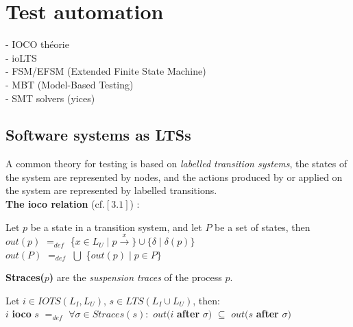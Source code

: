 \documentclass[a4paper]{report}
\begin{document}
\section*{Test automation}
- IOCO théorie\\
- ioLTS\\
- FSM/EFSM (Extended Finite State Machine)\\
- MBT (Model-Based Testing)\\
- SMT solvers (yices)\\

\subsection*{Software systems as LTSs}
A common theory for testing is based on \textit{labelled transition systems}, the states of the system are represented by nodes, and the actions produced by or applied on the system are represented by labelled transitions.\\
\newline
\textbf{The ioco relation} (cf.$[3.1]$) :\\
\newline

\begin{definition}
Let $p$ be a state in a transition system, and let $P$ be a set of states, then\\
\newline
$out(p)$ $=_{def}$ \{$x\in L_U \mid p \xrightarrow{x} \} \cup \{ \delta \mid \delta (p) \}$\\
\newline
$out(P)$ $=_{def}$ $ \bigcup$ \{$out(p) \mid p \in P \}$\\
\end{definition}

\begin{definition}
\textbf{Straces($p$)} are the \textit{suspension traces} of the process $p$.\\
\end{definition}

Let $i \in IOTS(L_I, L_U)$, $s \in LTS(L_I \cup L_U)$, then:\\
$i$ \textbf{ioco} $s$ $=_{def}$ $ \forall \sigma \in Straces(s): $ $out(i$ \textbf{after} $\sigma) $ $\subseteq$ $out(s$ \textbf{after} $\sigma) $\\
\end{document}
